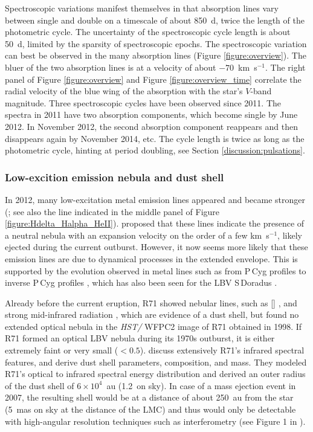 \documentclass[structabstract]{aa}
\begin{document}
Spectroscopic variations manifest themselves in that absorption lines vary between single and double on a timescale of about 850~d, twice the length of the photometric cycle. The uncertainty of the spectroscopic cycle length is about 50~d, limited by the sparsity of spectroscopic epochs. The spectroscopic variation can best be observed in the many  absorption lines (Figure \ref{figure:overview}).  The bluer of the two absorption lines is at a velocity of about $-70$~km~s$^{-1}$. The right panel of Figure \ref{figure:overview} and Figure \ref{figure:overview_time} correlate the radial velocity of the  blue wing of the  absorption with the star's $V$-band magnitude. Three spectroscopic cycles have been observed since 2011.  The spectra in 2011 have two absorption components, which become single by June 2012. In November 2012, the second absorption component reappears and then disappears again by November 2014, etc. The cycle length is twice as long as the photometric cycle, hinting at period doubling, see Section \ref{discussion:pulsations}.  



\subsubsection{Low-excition emission nebula and dust shell}
\label{nebula}

In 2012, many low-excitation metal emission lines appeared and became stronger (\citealt{2013A&A...555A.116M}; see also the  line indicated in the middle panel of Figure \ref{figure:Hdelta_Halpha_HeII}). \citet{2013A&A...555A.116M} proposed that these lines indicate the presence of a  neutral nebula with an expansion velocity on the order of a few  km~s$^{-1}$, likely ejected during the current outburst. However, it now seems more likely that these emission lines are due to dynamical processes in the extended envelope. This is supported by the evolution observed in metal lines such as  from P\,Cyg profiles to inverse P\,Cyg profiles \citep{2017AJ....154...15W}, which has also been seen for the LBV S\,Doradus \citep{1990A&A...235..340W}.

Already before the current eruption, R71 showed nebular lines, such as [] \citep{1986A&A...158..371S}, and strong mid-infrared radiation \citep{1984MNRAS.209..759G,1986A&A...164..435W,1999A&A...341L..67V}, which are evidence of a dust shell, but \citet{2003A&A...408..205W} found no extended optical nebula in the {\it HST/} WFPC2 image of R71 obtained in 1998. If R71 formed an optical LBV nebula during its 1970s outburst, it is either extremely faint or very small ($< 0.5$\arcsec).   \citet{2014A&A...569A..80G} discuss extensively R71's infrared spectral features, and derive dust shell parameters, composition, and mass. They modeled R71's optical to infrared spectral energy distribution and derived an outer radius of the dust shell of $6 \times 10^4$~au (1.2\arcsec\ on sky).
In case of a mass ejection event in 2007, the resulting shell would be at a distance of about 250~au from the star (5~mas on sky at the distance of the LMC) and thus would only be detectable with high-angular resolution techniques such as interferometry (see Figure 1 in \citealt{2016A&ARv..24....6B}).
\end{document}
